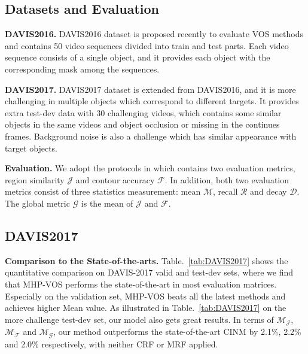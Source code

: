 \documentclass[10pt,twocolumn,letterpaper]{article}
\begin{document}
\subsection{Datasets and Evaluation}
\vspace{-5pt}

\textbf{DAVIS2016.} DAVIS2016 \cite{perazzi2016benchmark} dataset is proposed recently to evaluate VOS methods and contains 50 video sequences divided into train and test parts. Each video sequence consists of a single object, and it provides each object with the corresponding mask among the sequences. 

\textbf{DAVIS2017.} DAVIS2017 \cite{Pont-Tuset_arXiv_2017} dataset is extended from DAVIS2016, and it is more challenging in multiple objects which correspond to different targets. It provides extra test-dev data with 30 challenging videos, which contains some similar objects in the same videos and object occlusion or missing in the continues frames. Background noise is also a challenge which has similar appearance with target objects.

\textbf{Evaluation.} We adopt the protocols in \cite{perazzi2016benchmark} which contains two evaluation metrics, region similarity $\mathcal{J}$ and contour accuracy $\mathcal{F}$. 
In addition, both two evaluation metrics consist of three statistics measurement: mean $\mathcal{M}$, recall $\mathcal{R}$ and decay $\mathcal{D}$. The global metric $\mathcal{G}$ is the mean of $\mathcal{J}$ and $\mathcal{F}$.









\vspace{-5pt}
\subsection{DAVIS2017} 
\vspace{-5pt}












\textbf{Comparison to the State-of-the-arts.}
Table.~\ref{tab:DAVIS2017} shows the quantitative comparison on DAVIS-2017 valid and test-dev sets, where we find that MHP-VOS performs the state-of-the-art in most evaluation matrices. Especially on the validation set, MHP-VOS beats all the latest methods and achieves higher Mean value. As illustrated in Table.~\ref{tab:DAVIS2017} on the more challenge test-dev set, our model also gets great results. In terms of $\mathcal{M_J}$, $\mathcal{M_F}$ and $\mathcal{M_G}$, our method outperforms the state-of-the-art CINM \cite{bao2018cnn} by 2.1\%, 2.2\% and 2.0\% respectively, with neither CRF or MRF applied. 
\end{document}
